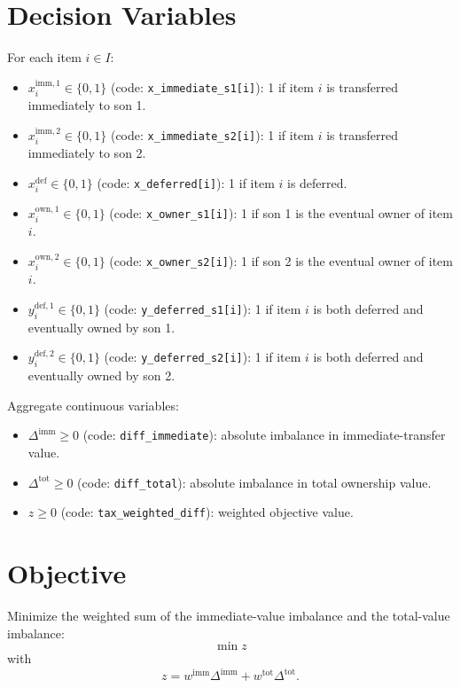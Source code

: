 \section*{Decision Variables}

For each item $i\in I$:
\begin{itemize}
\item $x^{\mathrm{imm},1}_i\in\{0,1\}$ (code: \texttt{x\_immediate\_s1[i]}): 1 if item $i$ is transferred immediately to son 1.
\item $x^{\mathrm{imm},2}_i\in\{0,1\}$ (code: \texttt{x\_immediate\_s2[i]}): 1 if item $i$ is transferred immediately to son 2.
\item $x^{\mathrm{def}}_i\in\{0,1\}$ (code: \texttt{x\_deferred[i]}): 1 if item $i$ is deferred.
\item $x^{\mathrm{own},1}_i\in\{0,1\}$ (code: \texttt{x\_owner\_s1[i]}): 1 if son 1 is the eventual owner of item $i$.
\item $x^{\mathrm{own},2}_i\in\{0,1\}$ (code: \texttt{x\_owner\_s2[i]}): 1 if son 2 is the eventual owner of item $i$.
\item $y^{\mathrm{def},1}_i\in\{0,1\}$ (code: \texttt{y\_deferred\_s1[i]}): 1 if item $i$ is both deferred and eventually owned by son 1.
\item $y^{\mathrm{def},2}_i\in\{0,1\}$ (code: \texttt{y\_deferred\_s2[i]}): 1 if item $i$ is both deferred and eventually owned by son 2.
\end{itemize}

Aggregate continuous variables:
\begin{itemize}
\item $\Delta^{\mathrm{imm}}\ge 0$ (code: \texttt{diff\_immediate}): absolute imbalance in immediate-transfer value.
\item $\Delta^{\mathrm{tot}}\ge 0$ (code: \texttt{diff\_total}): absolute imbalance in total ownership value.
\item $z\ge 0$ (code: \texttt{tax\_weighted\_diff}): weighted objective value.
\end{itemize}

\section*{Objective}

Minimize the weighted sum of the immediate-value imbalance and the total-value imbalance:
\[
\min z
\]
with
\[
z = w^{\mathrm{imm}} \Delta^{\mathrm{imm}} + w^{\mathrm{tot}} \Delta^{\mathrm{tot}}.
\]

